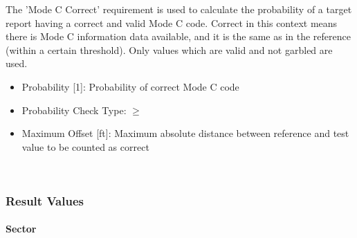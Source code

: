 The 'Mode C Correct' requirement is used to calculate the probability of a target report having a correct and valid Mode C code. 
Correct in this context means there is Mode C information data available, and it is the same as in the reference (within a certain threshold). Only values which are valid and not garbled are used. \\

\begin{itemize}  
\item Probability [1]: Probability of correct Mode C code
\item Probability Check Type: $\geq$
\item Maximum Offset [ft]: Maximum absolute distance between reference and test value to be counted as correct
\end{itemize}
\ \\

\subsubsection{Result Values}

\paragraph{Sector}

